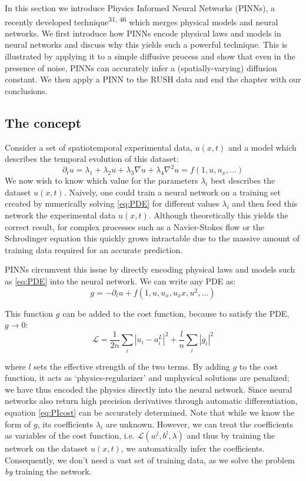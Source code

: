 \documentclass{Dissertate}
\begin{document}
In this section we introduce Physics Informed Neural Networks (PINNs), a
recently developed technique\textsuperscript{31, 46}
which merges physical models and neural networks. We first introduce how
PINNs encode physical laws and models in neural networks and discuss why
this yields such a powerful technique. This is illustrated by applying
it to a simple diffusive process and show that even in the presence of
noise, PINNs can accurately infer a (spatially-varying) diffusion
constant. We then apply a PINN to the RUSH data and end the chapter with
our conclusions.

\hypertarget{the-concept-1}{%
\subsection{The concept}\label{the-concept-1}}

Consider a set of spatiotemporal experimental data, \(u(x,t)\) and a
model which describes the temporal evolution of this dataset:
\begin{equation}
\partial_t u = \lambda_1 + \lambda_2 u + \lambda_3\nabla u + \lambda_4 \nabla^2 u = f(1, u, u_x, ...)
\label{eq:PDE}\end{equation} We now wish to know which value for the
parameters \(\lambda_i\) best describes the dataset \(u(x,t)\). Naively,
one could train a neural network on a training set created by
numerically solving \ref{eq:PDE} for different values
\(\lambda_{i}\) and then feed this network the experimental data
\(u(x,t)\). Although theoretically this yields the correct result, for
complex processes such as a Navier-Stokes flow or the Schrodinger
equation this quickly grows intractable due to the massive amount of
training data required for an accurate prediction.

PINNs circumvent this issue by directly encoding physical laws and
models such as \ref{eq:PDE} into the neural network. We can write
any PDE as: \begin{equation}
g = -\partial_t u + f(1, u, u_x, u_xx, u^2, ...)
\label{eq:PIcost}\end{equation}

This function \(g\) can be added to the cost function, because to satisfy
the PDE, \(g \to 0\): \[
\mathcal{L} = \frac{1}{2n}\sum_i|u_i-a^L_i|^2 + \frac{l}{n}\sum_i|g_i|^2
\]

where \(l\) sets the effective strength of the two terms. By adding
\(g\) to the cost function, it acts as `physics-regularizer' and
unphysical solutions are penalized; we have thus encoded the physics
directly into the neural network. Since neural networks also return high precision derivatives through automatic differentiation, equation \ref{eq:PIcost} can be accurately determined. Note that while we know the form of
\(g\), its coefficients \(\lambda_i\) are unknown. However, we can treat
the coefficients as variables of the cost function, i.e.
\(\mathcal{L}(w^l,b^l, \lambda)\) and thus by training the network on
the dataset \(u(x,t)\), we automatically infer the coefficients.
Consequently, we don't need a vast set of training data, as we solve the
problem \emph{by} training the network.
\end{document}
